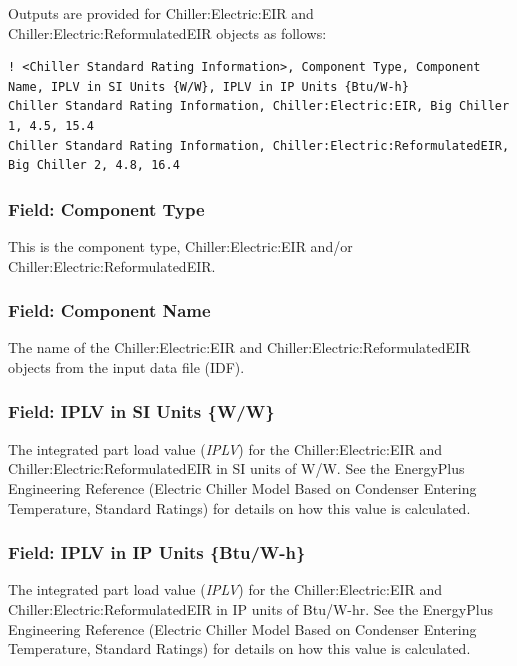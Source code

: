 Outputs are provided for Chiller:Electric:EIR and Chiller:Electric:ReformulatedEIR objects as follows:

\begin{lstlisting}
! <Chiller Standard Rating Information>, Component Type, Component Name, IPLV in SI Units {W/W}, IPLV in IP Units {Btu/W-h}
Chiller Standard Rating Information, Chiller:Electric:EIR, Big Chiller 1, 4.5, 15.4
Chiller Standard Rating Information, Chiller:Electric:ReformulatedEIR, Big Chiller 2, 4.8, 16.4
\end{lstlisting}

\subsubsection{Field: Component Type}\label{field-component-type-8}

This is the component type, Chiller:Electric:EIR and/or Chiller:Electric:ReformulatedEIR.

\subsubsection{Field: Component Name}\label{field-component-name-8}

The name of the Chiller:Electric:EIR and Chiller:Electric:ReformulatedEIR objects from the input data file (IDF).

\subsubsection{Field: IPLV in SI Units \{W/W\}}\label{field-iplv-in-si-units-ww}

The integrated part load value (\emph{IPLV}) for the Chiller:Electric:EIR and Chiller:Electric:ReformulatedEIR in SI units of W/W. See the EnergyPlus Engineering Reference (Electric Chiller Model Based on Condenser Entering Temperature, Standard Ratings) for details on how this value is calculated.

\subsubsection{Field: IPLV in IP Units \{Btu/W-h\}}\label{field-iplv-in-ip-units-btuw-h}

The integrated part load value (\emph{IPLV}) for the Chiller:Electric:EIR and Chiller:Electric:ReformulatedEIR in IP units of Btu/W-hr. See the EnergyPlus Engineering Reference (Electric Chiller Model Based on Condenser Entering Temperature, Standard Ratings) for details on how this value is calculated.

